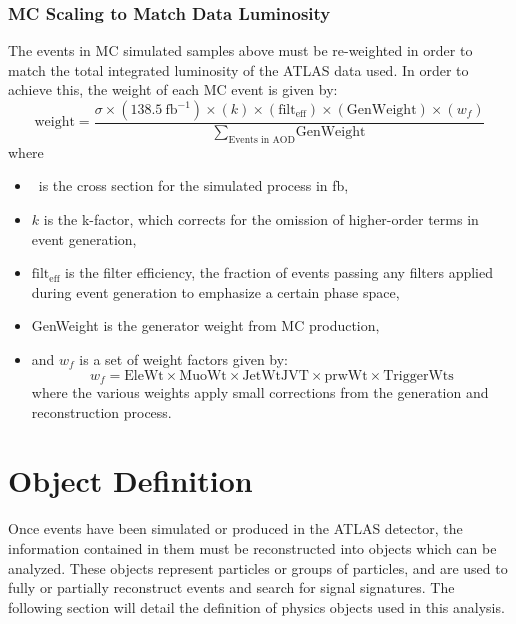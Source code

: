 \subsubsection{MC Scaling to Match Data Luminosity}
\label{subsubsection:mc_scaling}
The events in MC simulated samples above must be re-weighted in order to match the total integrated luminosity of the ATLAS data used. In order to achieve this, the weight of each MC event is given by:
\begin{equation}
\text{weight}  = \frac{ \sigma \times (138.5~\text{fb}^{-1}) \times (k) \times (\text{filt}_\text{eff}) \times (\text{GenWeight}) \times (w_f)}{\sum_{\text{Events~in~AOD}} \text{GenWeight} }
\end{equation}
where
\begin{itemize}
\item \sigma~is the cross section for the simulated process in fb,
\item $k$ is the k-factor, which corrects for the omission of higher-order terms in event generation,
\item $\text{filt}_\text{eff}$ is the filter efficiency, the fraction of events passing any filters applied during event generation to emphasize a certain phase space,
\item GenWeight is the generator weight from MC production,
\item and $w_f$ is a set of weight factors given by:
\begin{equation}
w_f = \text{EleWt} \times \text{MuoWt} \times \text{JetWtJVT} \times \text{prwWt}
 \times \text{TriggerWts}
\end{equation}
where the various weights apply small corrections from the generation and reconstruction process.
\end{itemize}


\section{Object Definition}
\label{section:objects}
Once events have been simulated or produced in the ATLAS detector, the information contained in them must be reconstructed into objects which can be analyzed. These objects represent particles or groups of particles, and are used to fully or partially reconstruct events and search for signal signatures. The following section will detail the definition of physics objects used in this analysis.

